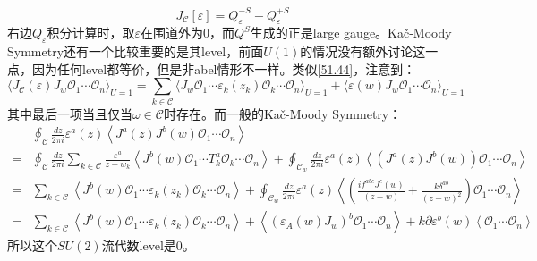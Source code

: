 \begin{equation}
	J_\mathcal{C}[\varepsilon]=Q_\varepsilon^{-S}-Q_\varepsilon^{+S}
\end{equation}
右边$Q_\varepsilon$积分计算时，取$\varepsilon$在围道外为0，而$Q^S$生成的正是large gauge。Ka\v{c}-Moody Symmetry还有一个比较重要的是其level，前面$U(1)$的情况没有额外讨论这一点，因为任何level都等价，但是非abel情形不一样。类似\ref{51.44}，注意到：
\begin{equation}
	\langle J_{\mathcal{C}}(\varepsilon)J_w\mathcal{O}_1\cdots \mathcal{O}_n\rangle_{U=1}=\sum_{k\in\mathcal{C}}\langle J_w\mathcal{O}_1\cdots\varepsilon_k(z_k)\mathcal{O}_k\cdots \mathcal{O}_n\rangle_{U=1}+\langle\varepsilon(w)J_w\mathcal{O}_1\cdots \mathcal{O}_n\rangle_{U=1}
\end{equation}
其中最后一项当且仅当$\omega\in\mathcal{C}$时存在。而一般的Ka\v{c}-Moody Symmetry：
\begin{equation}
	\begin{aligned}
		&\oint_\mathcal{C}\frac{dz}{2\pi i}\varepsilon^a(z)\left\langle J^a(z)J^b(w)\mathcal{O}_1\cdots\mathcal{O}_n\right\rangle\\
		=&\oint_\mathcal{C}\frac{dz}{2\pi i}\sum_{k\in\mathcal{C}} \frac{\varepsilon ^a}{z-w_k} \left\langle J^b(w)\mathcal{O}_1\cdots T^a_k\mathcal{O}_k\cdots\mathcal{O}_n\right\rangle
		+\oint_{\mathcal{C}_w}\frac{dz}{2\pi i}\varepsilon ^a(z)\left\langle \left(J^a(z)J^b(w)\right)\mathcal{O}_1\cdots\mathcal{O}_n\right\rangle\\
		=&\sum_{k\in\mathcal{C}}\left\langle J^b(w)\mathcal{O}_1\cdots \varepsilon_k(z_k)\mathcal{O}_k\cdots\mathcal{O}_n\right\rangle
		+\oint_{\mathcal{C}_w}\frac{dz}{2\pi i}\varepsilon ^a(z)\left\langle \left(\frac{if^{abc}J^c(w)}{(z-w)}+ \frac{k\delta^{ab}}{(z-w)^2} \right)\mathcal{O}_1\cdots\mathcal{O}_n\right\rangle\\
		=&\sum_{k\in\mathcal{C}}\left\langle J^b(w)\mathcal{O}_1\cdots \varepsilon_k(z_k)\mathcal{O}_k\cdots\mathcal{O}_n\right\rangle
		+\left\langle\left(\varepsilon_A(w)J_w\right)^b\mathcal{O}_1\cdots \mathcal{O}_n\right\rangle
		+k\partial \varepsilon^b(w)\left\langle\mathcal{O}_1\cdots \mathcal{O}_n\right \rangle
	\end{aligned}
\end{equation}
所以这个$SU(2)$流代数level是0。

